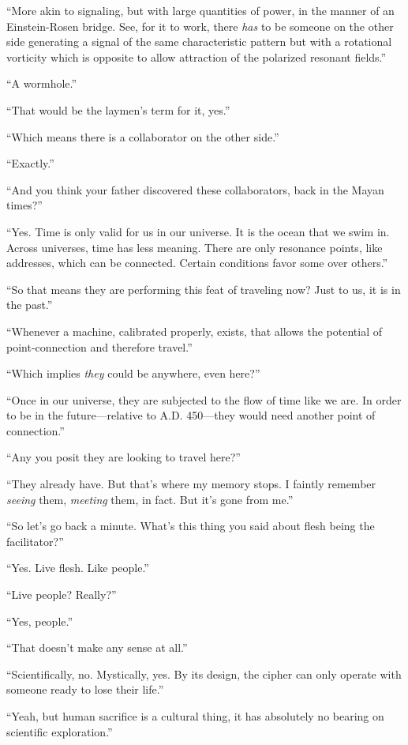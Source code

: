 ``More akin to signaling, but with large quantities of power, in the
manner of an Einstein-Rosen bridge. See, for it to work, there
\emph{has} to be someone on the other side generating a signal of the
same characteristic pattern but with a rotational vorticity which is
opposite to allow attraction of the polarized resonant fields.''

``A wormhole.''

``That would be the laymen's term for it, yes.''

``Which means there is a collaborator on the other side.''

``Exactly.''

``And you think your father discovered these collaborators, back in the
Mayan times?''

``Yes. Time is only valid for us in our universe. It is the ocean that
we swim in. Across universes, time has less meaning. There are only
resonance points, like addresses, which can be connected. Certain
conditions favor some over others.''

``So that means they are performing this feat of traveling now? Just to
us, it is in the past.''

``Whenever a machine, calibrated properly, exists, that allows the
potential of point-connection and therefore travel.''

``Which implies \emph{they} could be anywhere, even here?''

``Once in our universe, they are subjected to the flow of time like we
are. In order to be in the future---relative to A.D. 450---they would
need another point of connection.''

``Any you posit they are looking to travel here?''

``They already have. But that's where my memory stops. I faintly
remember \emph{seeing} them, \emph{meeting} them, in fact. But it's gone
from me.''

``So let's go back a minute. What's this thing you said about flesh
being the facilitator?''

``Yes. Live flesh. Like people.''

``Live people? Really?''

``Yes, people.''

``That doesn't make any sense at all.''

``Scientifically, no. Mystically, yes. By its design, the cipher can
only operate with someone ready to lose their life.''

``Yeah, but human sacrifice is a cultural thing, it has absolutely no
bearing on scientific exploration.''

